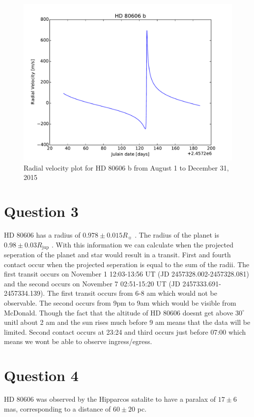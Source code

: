 \documentclass[preprint]{aastex}
\begin{document}
\begin{figure}[h]
\begin{center}
    \includegraphics[width=\textwidth]{Q2.pdf}
    \caption{Radial velocity plot for HD 80606 b from August 1 to December 31, 2015}
    \label{fig:RV}
\end{center}
\end{figure}

\section{Question 3}

HD 80606 has a radius of $0.978\pm0.015 R_\sun$ \citep{orbparam}. The radius of the planet is $0.98\pm0.03 R_\mathrm{jup}$ \citep{orbparam}. With this information we can calculate when the projected seperation of the planet and star would result in a transit. First and fourth contact occur when the projected seperation is equal to the sum of the radii. The first transit occurs on November 1 12:03-13:56 UT (JD 2457328.002-2457328.081) and the second occurs on November 7 02:51-15:20 UT (JD 2457333.691-2457334.139). The first transit occurs from 6-8 am which would not be observable. The second occurs from 9pm to 9am which would be visible from McDonald. Though the fact that the altitude of HD 80606 doesnt get above $30^\circ$ unitl about 2 am and the sun rises much before 9 am means that the data will be limited. Second contact occurs at 23:24 and third occurs just before 07:00 which means we wont be able to observe ingress/egress.

\section{Question 4}

HD 80606 was observed by the Hipparcos satalite to have a paralax of $17\pm6$ mas, corresponding to a distance of $60\pm20$ pc.




\end{document}
